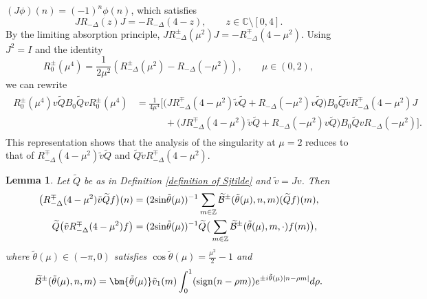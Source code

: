 \documentclass[reqno, 11pt]{amsart}
\newtheorem{lemma}[definition]{Lemma}
\newcommand\Z{\mathbb{Z}}
\newcommand\C{\mathbb{C}}
\newcommand\mcaB{\mathcal{B}}
\numberwithin{equation}{section}
\begin{document}
$(J\phi)(n)=(-1)^n\phi(n)$, which satisfies
\begin{equation}\label{rela bet 0 and 4 for Laplacian}
JR_{-\Delta}(z)J=-R_{-\Delta}(4-z),\qquad z\in\C\setminus[0,4].
\end{equation}
By the limiting absorption principle, $JR^{\pm}_{-\Delta}(\mu^2)J=-R^{\mp}_{-\Delta}(4-\mu^2)$. Using $J^2=I$ and the identity
\begin{equation}\label{deco of R0}
R^{\pm}_{0}(\mu^4)=\frac{1}{2\mu^2}\left(R^{\pm}_{-\Delta}(\mu^2)-R_{-\Delta}(-\mu^2)\right),\qquad\mu\in(0,2), 
\end{equation}
we can rewrite 
\begin{align}\label{R0vQBQvR0}
\begin{split}
R^{\pm}_0(\mu^4)v\widetilde{Q}B_{0}\widetilde{Q}vR^{\pm}_0(\mu^4)&=\frac{1}{4\mu^4}\Big[\Big(JR^{\mp}_{-\Delta}(4-\mu^2)\tilde{v}\widetilde{Q}+R_{-\Delta}(-\mu^2)v\widetilde{Q}\Big)B_{0}\widetilde{Q}\tilde{v}R^{\mp}_{-\Delta}(4-\mu^2)J\\
&\quad\quad\quad+\Big(JR^{\mp}_{-\Delta}(4-\mu^2)\tilde{v}\widetilde{Q}+R_{-\Delta}(-\mu^2)v\widetilde{Q}\Big)B_{0}\widetilde{Q}vR_{-\Delta}(-\mu^2)\Big].
\end{split}
\end{align}
This representation shows that the analysis of the singularity at $\mu=2$ reduces to that of  $R^{\mp}_{-\Delta}(4-\mu^2)\tilde{v}\widetilde{Q}$ and $\widetilde{Q}\tilde{v}R^{\mp}_{-\Delta}(4-\mu^2)$.
\begin{lemma}\label{cancelation lemma16}
Let $\widetilde{Q}$ be as in Definition \ref{definition of Sjtilde} and $\tilde{v}=Jv$. Then
\begin{align*}
    \big(R^{\mp}_{-\Delta}(4-\mu^2)\tilde{v}\widetilde{Q}f\big)(n)&=(2{\rm sin}\tilde{\theta}(\mu))^{-1}\sum\limits_{m\in\Z}\widetilde{\mcaB}^{\pm}(\tilde{\theta}(\mu),n,m)(\widetilde{Q}f)(m),\\
\widetilde{Q}\big(\tilde{v}R^{\mp}_{-\Delta}(4-\mu^2)f\big)&=(2{\rm sin}\tilde{\theta}(\mu))^{-1}\widetilde{Q}\big(\sum\limits_{m\in\Z}\widetilde{\mcaB}^{\pm}(\tilde{\theta}(\mu),m,\cdot)f(m)\big),
\end{align*}
where $\tilde{\theta}(\mu)\in(-\pi,0)$ satisfies $\cos\tilde{\theta}(\mu)=\frac{\mu^2}{2}-1$ and
\begin{equation*}
    \widetilde{\mcaB}^{\pm}(\tilde{\theta}(\mu),n,m)={\bm {\tilde{\theta}(\mu)}}\tilde{v}_1(m)\int_{0}^{1}({\rm sign}(n-\rho m))e^{\pm i\tilde{\theta}(\mu)|n-\rho m|}d\rho.
\end{equation*}
\end{lemma}
\end{document}
